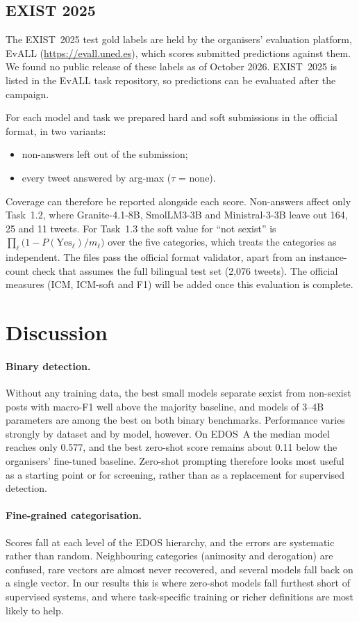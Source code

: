 \documentclass[11pt]{article}
\begin{document}
\subsection{EXIST 2025}\label{sec:exist}
The EXIST~2025 test gold labels are held by the organisers' evaluation platform, EvALL (\url{https://evall.uned.es}), which scores submitted predictions against them. We found no public release of these labels as of October 2026. EXIST~2025 is listed in the EvALL task repository, so predictions can be evaluated after the campaign.

For each model and task we prepared hard and soft submissions in the official format, in two variants:
\begin{itemize}
  \item non-answers left out of the submission;
  \item every tweet answered by arg-max ($\tau$ = none).
\end{itemize}
Coverage can therefore be reported alongside each score. Non-answers affect only Task~1.2, where Granite-4.1-8B, SmolLM3-3B and Ministral-3-3B leave out 164, 25 and 11 tweets. For Task~1.3 the soft value for ``not sexist'' is $\prod_{\ell}\bigl(1 - P(\text{Yes}_\ell)/m_\ell\bigr)$ over the five categories, which treats the categories as independent. The files pass the official format validator, apart from an instance-count check that assumes the full bilingual test set (2{,}076 tweets). The official measures (ICM, ICM-soft and F1) will be added once this evaluation is complete.

\section{Discussion}\label{sec:discussion}
\paragraph{Binary detection.} Without any training data, the best small models separate sexist from non-sexist posts with macro-F1 well above the majority baseline, and models of 3--4B parameters are among the best on both binary benchmarks. Performance varies strongly by dataset and by model, however. On EDOS~A the median model reaches only 0.577, and the best zero-shot score remains about 0.11 below the organisers' fine-tuned baseline. Zero-shot prompting therefore looks most useful as a starting point or for screening, rather than as a replacement for supervised detection.

\paragraph{Fine-grained categorisation.} Scores fall at each level of the EDOS hierarchy, and the errors are systematic rather than random. Neighbouring categories (animosity and derogation) are confused, rare vectors are almost never recovered, and several models fall back on a single vector. In our results this is where zero-shot models fall furthest short of supervised systems, and where task-specific training or richer definitions are most likely to help.
\end{document}
